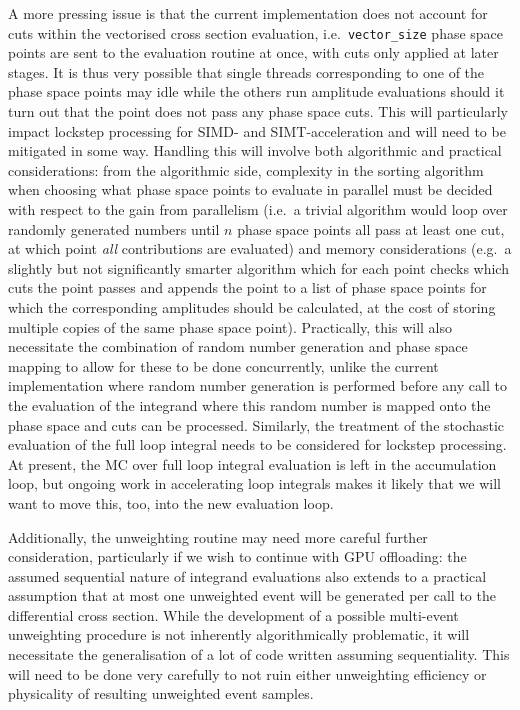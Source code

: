 \documentclass[a4paper,11pt]{article}
\begin{document}
A more pressing issue is that the current implementation does not account for cuts within the vectorised cross section evaluation, i.e.\ \texttt{vector\_size} phase space points are sent to the evaluation routine at once, with cuts only applied at later stages. It is thus very possible that single threads corresponding to one of the phase space points may idle while the others run amplitude evaluations should it turn out that the point does not pass any phase space cuts. This will particularly impact lockstep processing for SIMD- and SIMT-acceleration and will need to be mitigated in some way. Handling this will involve both algorithmic and practical considerations: from the algorithmic side, complexity in the sorting algorithm when choosing what phase space points to evaluate in parallel must be decided with respect to the gain from parallelism (i.e.\ a trivial algorithm would loop over randomly generated numbers until $n$ phase space points all pass at least one cut, at which point \textit{all} contributions are evaluated) and memory considerations (e.g.\ a slightly but not significantly smarter algorithm which for each point checks which cuts the point passes and appends the point to a list of phase space points for which the corresponding amplitudes should be calculated, at the cost of storing multiple copies of the same phase space point). Practically, this will also necessitate the combination of random number generation and phase space mapping to allow for these to be done concurrently, unlike the current implementation where random number generation is performed before any call to the evaluation of the integrand where this random number is mapped onto the phase space and cuts can be processed. Similarly, the treatment of the stochastic evaluation of the full loop integral needs to be considered for lockstep processing. At present, the MC over full loop integral evaluation is left in the accumulation loop, but ongoing work in accelerating loop integrals makes it likely that we will want to move this, too, into the new evaluation loop.

Additionally, the unweighting routine may need more careful further consideration, particularly if we wish to continue with GPU offloading: the assumed sequential nature of integrand evaluations also extends to a practical assumption that at most one unweighted event will be generated per call to the differential cross section. While the development of a possible multi-event unweighting procedure is not inherently algorithmically problematic, it will necessitate the generalisation of a lot of code written assuming sequentiality. This will need to be done very carefully to not ruin either unweighting efficiency or physicality of resulting unweighted event samples.
\end{document}
